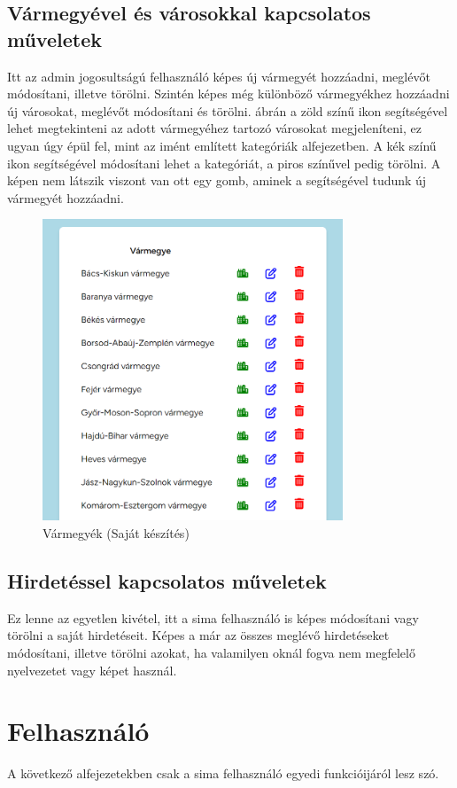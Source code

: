\documentclass[]{thesis-ekf}
\theoremstyle{definition}
\theoremstyle{remark}
\begin{document}
	\subsection{Vármegyével és városokkal kapcsolatos műveletek}
	Itt az admin jogosultságú felhasználó képes új vármegyét hozzáadni, meglévőt módosítani, illetve törölni. Szintén képes még különböző vármegyékhez hozzáadni új városokat, meglévőt módosítani és törölni.  ábrán a zöld színű ikon segítségével lehet megtekinteni az adott vármegyéhez tartozó városokat megjeleníteni, ez ugyan úgy épül fel, mint az imént említett kategóriák  alfejezetben. A kék színű ikon segítségével módosítani lehet a kategóriát, a piros színűvel pedig törölni. A képen nem látszik viszont van ott egy gomb, aminek a segítségével tudunk új vármegyét hozzáadni.
	\begin{figure}[ht!]
		\centering
		\includegraphics[height=9cm]{./felhasznaloi/varmegye}
		\caption{Vármegyék (Saját készítés)} 
		\label{varmegye-varos-muvelet}
	\end{figure}
	\subsection{Hirdetéssel kapcsolatos műveletek}
	Ez lenne az egyetlen kivétel, itt a sima felhasználó is képes módosítani vagy törölni a saját hirdetéseit. Képes a már az összes meglévő hirdetéseket módosítani, illetve törölni azokat, ha valamilyen oknál fogva nem megfelelő nyelvezetet vagy képet használ.
	
	\section{Felhasználó}
	A következő alfejezetekben csak a sima felhasználó egyedi funkcióijáról lesz szó.
\end{document}
